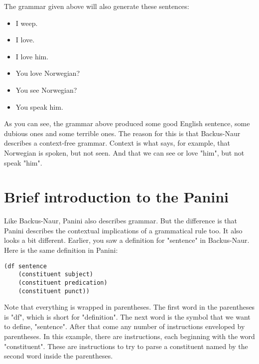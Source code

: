 \documentclass{article}
\begin{document}
The grammar given above will also generate these sentences:
\begin{itemize}
	\item I weep.
	\item I love.
	\item I love him.
	\item You love Norwegian?
	\item You see Norwegian?
	\item You speak him.
\end{itemize}

As you can see, the grammar above produced some good English sentence, some dubious ones and some terrible ones. The reason for this
is that Backus-Naur describes a context-free grammar. Context is what says, for example, that Norwegian is spoken, but not seen. And
that we can see or love "him", but not speak "him".

\section{Brief introduction to the Panini}
Like Backus-Naur, Panini also describes grammar. But the difference is that Panini describes the contextual implications of a 
grammatical rule too. It also looks a bit different. Earlier, you saw a definition for "sentence" in Backus-Naur. Here is the same 
definition in Panini:
\begin{lstlisting}
(df sentence
	(constituent subject)
	(constituent predication)
	(constituent punct))
\end{lstlisting}
Note that everything is wrapped in parentheses. The first word in the parentheses is "df", which is short for "definition". The next
word is the symbol that we want to define, "sentence". After that come any number of instructions enveloped by parentheses. In this
example, there are instructions, each beginning with the word "constituent". These are instructions to try to parse a constituent 
named by the second word inside the parentheses.


\label{end}
\end{document}

